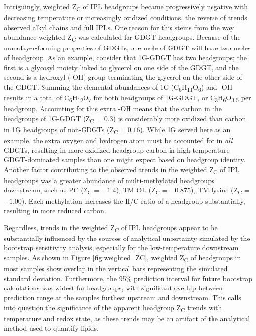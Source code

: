 Intriguingly, weighted Z\textsubscript{C} of IPL headgroups became progressively negative with decreasing temperature or increasingly oxidized conditions, the reverse of trends observed alkyl chains and full IPLs. One reason for this stems from the way abundance-weighted Z\textsubscript{C} was calculated for GDGT headgroups. Because of the monolayer-forming properties of GDGTs, one mole of GDGT will have two moles of headgroup. As an example, consider that 1G-GDGT has two headgroups; the first is a glycosyl moiety linked to glycerol on one side of the GDGT, and the second is a hydroxyl (-OH) group terminating the glycerol on the other side of the GDGT. Summing the elemental abundances of 1G (C\textsubscript{6}H\textsubscript{11}O\textsubscript{6}) and -OH results in a total of C\textsubscript{6}H\textsubscript{12}O\textsubscript{7} for both headgroups of 1G-GDGT, or C\textsubscript{3}H\textsubscript{6}O\textsubscript{3.5} per headgroup. Accounting for this extra -OH means that the carbon in the headgroups of 1G-GDGT (Z\textsubscript{C} = $0.\overline{3}$) is considerably more oxidized than carbon in 1G headgroups of non-GDGTs (Z\textsubscript{C} = $0.1\overline{6}$). While 1G served here as an example, the extra oxygen and hydrogen atom must be accounted for in \textit{all} GDGTs, resulting in more oxidized headgroup carbon in high-temperature GDGT-dominated samples than one might expect based on headgroup identity. Another factor contributing to the observed trends in the weighted Z\textsubscript{C} of IPL headgroups was a greater abundance of multi-methylated headgroups downstream, such as PC (Z\textsubscript{C} = $-1.4$), TM-OL (Z\textsubscript{C} = $-0.875$), TM-lysine (Z\textsubscript{C} = $-1.00$). Each methylation increases the H/C ratio of a headgroup substantially, resulting in more reduced carbon.

Regardless, trends in the weighted Z\textsubscript{C} of IPL headgroups appear to be substantially influenced by the sources of analytical uncertainty simulated by the bootstrap sensitivity analysis, especially for the low-temperature downstream samples. As shown in Figure \ref{fig:weighted_ZC}, weighted Z\textsubscript{C} of headgroups in most samples show overlap in the vertical bars representing the simulated standard deviation. Furthermore, the 95\% prediction interval for future bootstrap calculations was widest for headgroups, with significant overlap between prediction range at the samples furthest upstream and downstream. This calls into question the significance of the apparent headgroup Z\textsubscript{C} trends with temperature and redox state, as these trends may be an artifact of the analytical method used to quantify lipids.




